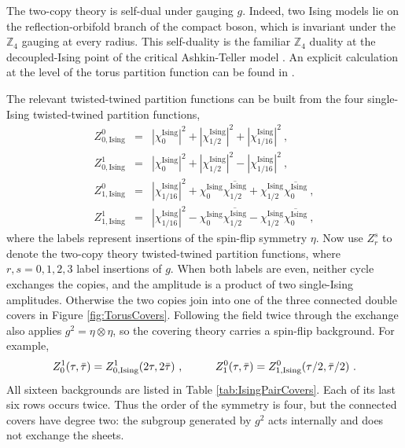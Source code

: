 \documentclass[12pt]{article}
\numberwithin{equation}{section}
\newcommand{\bea}{\begin{eqnarray}}
\newcommand{\eea}{\end{eqnarray}}
\def\no{\nonumber}
\def\ZZ{\mathbb{Z}}
\theoremstyle{remark}
\begin{document}
The two-copy theory is self-dual under gauging $g$. Indeed, two Ising models lie on the reflection-orbifold branch of the compact boson, which is invariant under the $\ZZ_4$ gauging at every radius.  This self-duality is the familiar $\ZZ_4$ duality at the decoupled-Ising point of the critical Ashkin-Teller model \cite{Yang:1987wk,Diatlyk:2023fwf}. An explicit calculation at the level of the torus partition function can be found in \cite{Thorngren:2021yso}.


The relevant twisted-twined partition functions can be built from the four single-Ising twisted-twined partition functions, 
\bea \label{eq:IsingSpinFlipBlocks}
Z^0_{0,\mathrm{Ising}}&=&|\chi^{\mathrm{Ising}}_0|^2+|\chi^{\mathrm{Ising}}_{1/2}|^2+|\chi^{\mathrm{Ising}}_{1/16}|^2~,\no\\
Z^1_{0,\mathrm{Ising}}&=&|\chi^{\mathrm{Ising}}_0|^2+|\chi^{\mathrm{Ising}}_{1/2}|^2-|\chi^{\mathrm{Ising}}_{1/16}|^2~,\no\\
Z^0_{1,\mathrm{Ising}}&=&|\chi^{\mathrm{Ising}}_{1/16}|^2+\chi^{\mathrm{Ising}}_0\overline{\chi^{\mathrm{Ising}}_{1/2}}+\chi^{\mathrm{Ising}}_{1/2}\overline{\chi^{\mathrm{Ising}}_0}~,\no\\
Z^1_{1,\mathrm{Ising}}&=&|\chi^{\mathrm{Ising}}_{1/16}|^2-\chi^{\mathrm{Ising}}_0\overline{\chi^{\mathrm{Ising}}_{1/2}}-\chi^{\mathrm{Ising}}_{1/2}\overline{\chi^{\mathrm{Ising}}_0}~,
\eea
where the labels represent insertions of the spin-flip symmetry $\eta$.
Now use $Z^s_r$ to denote the two-copy theory twisted-twined partition functions, where $r,s=0,1,2,3$ label insertions of $g$. When both labels are even, neither cycle exchanges the copies, and the amplitude is a product of two single-Ising amplitudes. Otherwise the two copies join into one of the three connected double covers in Figure \ref{fig:TorusCovers}. Following the field twice through the exchange also applies $g^2=\eta\otimes\eta$, so the covering theory carries a spin-flip background. For example,
\bea
Z^1_0(\tau,\bar\tau)=Z^1_{0,\mathrm{Ising}}(2\tau,2\bar\tau)~,
\hspace{0.4 in}
Z^0_1(\tau,\bar\tau)=Z^0_{1,\mathrm{Ising}}(\tau/2,\bar\tau/2)~.
\eea
All sixteen backgrounds are listed in Table \ref{tab:IsingPairCovers}. Each of its last six rows occurs twice. Thus the order of the symmetry is four, but the connected covers have degree two: the subgroup generated by $g^2$ acts internally and does not exchange the sheets.
\end{document}
